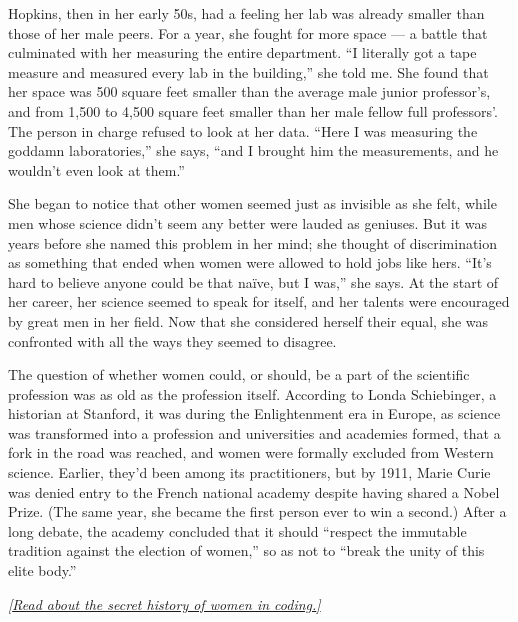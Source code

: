 Hopkins, then in her early 50s, had a feeling her lab was already
smaller than those of her male peers. For a year, she fought for more
space --- a battle that culminated with her measuring the entire
department. ``I literally got a tape measure and measured every lab in
the building,'' she told me. She found that her space was 500 square
feet smaller than the average male junior professor's, and from 1,500 to
4,500 square feet smaller than her male fellow full professors'. The
person in charge refused to look at her data. ``Here I was measuring the
goddamn laboratories,'' she says, ``and I brought him the measurements,
and he wouldn't even look at them.''

She began to notice that other women seemed just as invisible as she
felt, while men whose science didn't seem any better were lauded as
geniuses. But it was years before she named this problem in her mind;
she thought of discrimination as something that ended when women were
allowed to hold jobs like hers. ``It's hard to believe anyone could be
that naïve, but I was,'' she says. At the start of her career, her
science seemed to speak for itself, and her talents were encouraged by
great men in her field. Now that she considered herself their equal, she
was confronted with all the ways they seemed to disagree.

The question of whether women could, or should, be a part of the
scientific profession was as old as the profession itself. According to
Londa Schiebinger, a historian at Stanford, it was during the
Enlightenment era in Europe, as science was transformed into a
profession and universities and academies formed, that a fork in the
road was reached, and women were formally excluded from Western science.
Earlier, they'd been among its practitioners, but by 1911, Marie Curie
was denied entry to the French national academy despite having shared a
Nobel Prize. (The same year, she became the first person ever to win a
second.) After a long debate, the academy concluded that it should
``respect the immutable tradition against the election of women,'' so as
not to ``break the unity of this elite body.''

\href{https://www.nytimes3xbfgragh.onion/2019/02/13/magazine/women-coding-computer-programming.html}{\emph{{[}Read
about the secret history of women in coding.{]}}}

